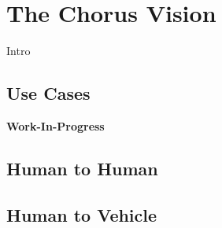 \documentclass{llncs}
\begin{document}
{%



	


	\section{The Chorus Vision}
		\label{s:section-3}
		
		
		Intro


		
		\subsection{Use Cases}
			\label{ss:use-cases}

			\textbf{Work-In-Progress}
			
			\subsection{Human to Human}

			\subsection{Human to Vehicle}
		
}
\end{document}
